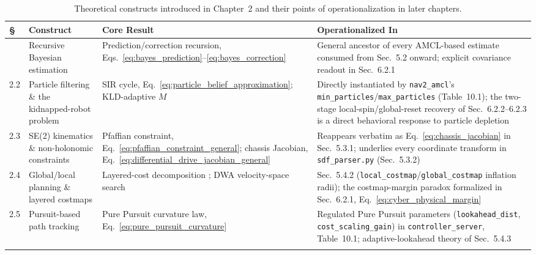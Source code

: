 \begin{table}[p]
\centering
\small
\setlength{\tabcolsep}{5pt}
\renewcommand{\arraystretch}{1.35}
\caption{Theoretical constructs introduced in Chapter~2 and their points of operationalization in later chapters.}
\label{tab:ch2_crossref}
\begin{tabularx}{\textwidth}{@{} >{\raggedright\arraybackslash}p{0.6cm} >{\raggedright\arraybackslash}p{3.1cm} X >{\raggedright\arraybackslash}p{6.6cm} @{}}
\toprule
\textbf{\S} & \textbf{Construct} & \textbf{Core Result} & \textbf{Operationalized In} \\ \midrule

2.1 & Recursive Bayesian estimation & Prediction/correction recursion, Eqs.~\eqref{eq:bayes_prediction}--\eqref{eq:bayes_correction} & General ancestor of every AMCL-based estimate consumed from Sec.~5.2 onward; explicit covariance readout in Sec.~6.2.1 \\ \addlinespace

2.2 & Particle filtering \& the kidnapped-robot problem & SIR cycle, Eq.~\eqref{eq:particle_belief_approximation}; KLD-adaptive $M$ & Directly instantiated by \texttt{nav2\_amcl}'s \texttt{min\_particles}/\texttt{max\_particles} (Table~10.1); the two-stage local-spin/global-reset recovery of Sec.~6.2.2--6.2.3 is a direct behavioral response to particle depletion \\ \addlinespace

2.3 & SE(2) kinematics \& non-holonomic constraints & Pfaffian constraint, Eq.~\eqref{eq:pfaffian_constraint_general}; chassis Jacobian, Eq.~\eqref{eq:differential_drive_jacobian_general} & Reappears verbatim as Eq.~\eqref{eq:chassis_jacobian} in Sec.~5.3.1; underlies every coordinate transform in \texttt{sdf\_parser.py} (Sec.~5.3.2) \\ \addlinespace

2.4 & Global/local planning \& layered costmaps & Layered-cost decomposition \cite{lu2014layered}; DWA velocity-space search \cite{fox1997dynamic} & Sec.~5.4.2 (\texttt{local\_costmap}/\texttt{global\_costmap} inflation radii); the costmap-margin paradox formalized in Sec.~6.2.1, Eq.~\eqref{eq:cyber_physical_margin} \\ \addlinespace

2.5 & Pursuit-based path tracking & Pure Pursuit curvature law, Eq.~\eqref{eq:pure_pursuit_curvature} & Regulated Pure Pursuit parameters (\texttt{lookahead\_dist}, \texttt{cost\_scaling\_gain}) in \texttt{controller\_server}, Table~10.1; adaptive-lookahead theory of Sec.~5.4.3 \\ \addlinespace


\end{tabularx}
\end{table}
